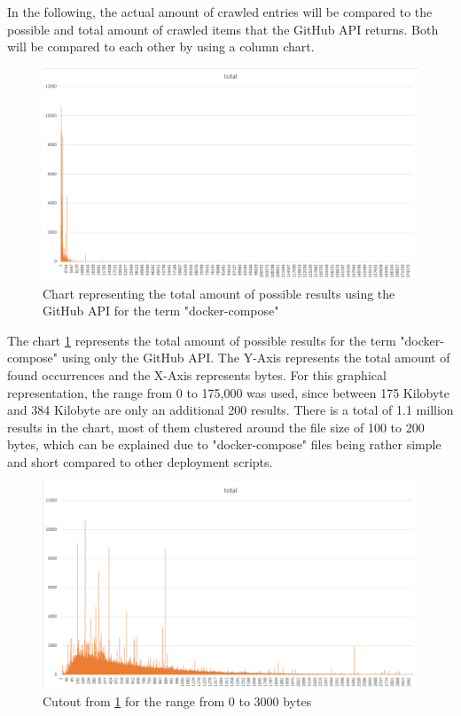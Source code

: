 In the following, the actual amount of crawled entries will be compared to the possible and total amount of crawled items that the GitHub API returns. Both will be compared to each other by using a column chart.

\begin{figure}[H]
    \centering
    \includegraphics[scale=0.5]{graphics/stats_total.png}
    \caption{Chart representing the total amount of possible results using the GitHub API for the term "docker-compose"}
    \label{fig:stats_total}
\end{figure}

The chart \ref{fig:stats_total} represents the total amount of possible results for the term "docker-compose" using only the GitHub API. The Y-Axis represents the total amount of found occurrences and the X-Axis represents bytes. For this graphical representation, the range from 0 to 175,000 was used, since between 175 Kilobyte and 384 Kilobyte are only an additional 200 results. There is a total of 1.1 million results in the chart, most of them clustered around the file size of 100 to 200 bytes, which can be explained due to "docker-compose" files being rather simple and short compared to other deployment scripts. 

\begin{figure}[H]
    \centering
    \includegraphics[scale=0.5]{graphics/stats_range.png}
    \caption{Cutout from \ref{fig:stats_total} for the range from 0 to 3000 bytes }
    \label{fig:stats_range}
\end{figure}

